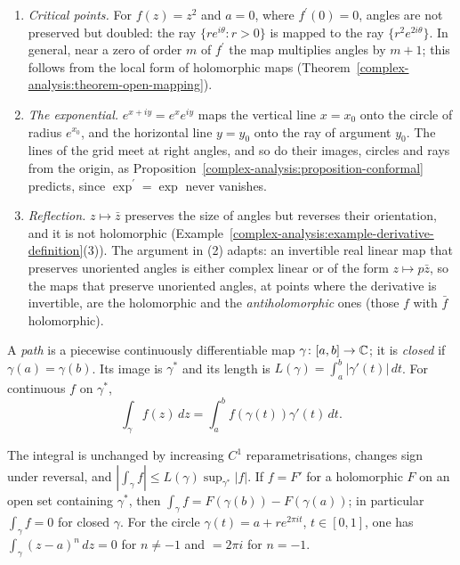 \begin{example}\label{complex-analysis:example-conformal}
\begin{enumerate}
\item \emph{Critical points.} For $f(z) = z^2$ and $a = 0$, where $f^{\prime}(0) = 0$, angles are not preserved but doubled: the ray $\{re^{i\theta} : r > 0\}$ is mapped to the ray $\{r^2e^{2i\theta}\}$. In
general, near a zero of order $m$ of $f^{\prime}$ the map multiplies angles by $m + 1$; this follows from the local form of holomorphic maps (Theorem~\ref{complex-analysis:theorem-open-mapping}).
\item \emph{The exponential.} $e^{x + iy} = e^xe^{iy}$ maps the vertical line $x = x_0$ onto the circle of radius $e^{x_0}$, and the horizontal line $y = y_0$ onto the ray of argument $y_0$. The lines of the
grid meet at right angles, and so do their images, circles and rays from the origin, as Proposition~\ref{complex-analysis:proposition-conformal} predicts, since $\exp^{\prime} = \exp$ never vanishes.
\item \emph{Reflection.} $z \mapsto \bar z$ preserves the size of angles but reverses their orientation, and it is not holomorphic
(Example~\ref{complex-analysis:example-derivative-definition}(3)). The argument in (2) adapts: an invertible real linear map that preserves unoriented angles is either complex linear or of the form
$z \mapsto p\bar z$, so the maps that preserve unoriented angles, at points where the derivative is invertible, are the holomorphic and the \emph{antiholomorphic} ones (those $f$ with $\bar f$ holomorphic).
\end{enumerate}
\end{example}

\begin{definition}\label{complex-analysis:definition-path-integral}
A \emph{path} is a piecewise continuously differentiable map $\gamma \colon [a, b] \to \mathbb{C}$; it is \emph{closed} if $\gamma(a) = \gamma(b)$. Its image is $\gamma^*$ and its length is
$L(\gamma) = \int_a^b|\gamma'(t)|\,dt$. For continuous $f$ on $\gamma^*$,
\[
\int_\gamma f(z)\,dz = \int_a^bf(\gamma(t))\gamma'(t)\,dt.
\]
\end{definition}

\begin{lemma}\label{complex-analysis:lemma-path-integral}
The integral is unchanged by increasing $C^1$ reparametrisations, changes sign under reversal, and $|\int_\gamma f| \leq L(\gamma)\sup_{\gamma^*}|f|$. If $f = F'$ for a holomorphic $F$ on an open set
containing $\gamma^*$, then $\int_\gamma f = F(\gamma(b)) - F(\gamma(a))$; in particular $\int_\gamma f = 0$ for closed $\gamma$. For the circle $\gamma(t) = a + re^{2\pi it}$, $t \in [0, 1]$, one has
$\int_\gamma(z - a)^n\,dz = 0$ for $n \neq -1$ and $= 2\pi i$ for $n = -1$.
\end{lemma}

